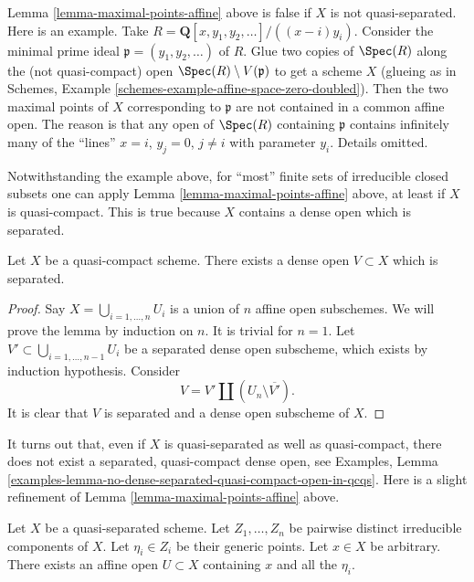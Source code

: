 \begin{remark}
\label{remark-maximal-points-affine}
Lemma \ref{lemma-maximal-points-affine} above is false if $X$
is not quasi-separated. Here is an example. Take
$R = \mathbf{Q}[x, y_1, y_2, \ldots]/((x-i)y_i)$.
Consider the minimal prime ideal $\mathfrak p = (y_1, y_2, \ldots)$
of $R$. Glue two copies of $\Spec(R)$ along the
(not quasi-compact) open $\Spec(R) \setminus V(\mathfrak p)$
to get a scheme $X$ (glueing as in
Schemes, Example \ref{schemes-example-affine-space-zero-doubled}).
Then the two maximal points of $X$ corresponding to $\mathfrak p$
are not contained in a common affine open. The reason is
that any open of $\Spec(R)$ containing $\mathfrak p$
contains infinitely many of the ``lines'' $x = i$, $y_j = 0$,
$j \not = i$ with parameter $y_i$. Details omitted.
\end{remark}

\noindent
Notwithstanding the example above, for ``most'' finite sets of irreducible
closed subsets one can apply Lemma \ref{lemma-maximal-points-affine} above,
at least if $X$ is quasi-compact. This is true because $X$ contains a dense
open which is separated.

\begin{lemma}
\label{lemma-quasi-compact-dense-open-separated}
Let $X$ be a quasi-compact scheme.
There exists a dense open $V \subset X$ which is separated.
\end{lemma}

\begin{proof}
Say $X = \bigcup_{i = 1, \ldots, n} U_i$ is a union of $n$ affine open
subschemes. We will prove the lemma by induction on $n$. It is trivial for
$n = 1$. Let $V' \subset \bigcup_{i = 1, \ldots, n - 1} U_i$ be a separated
dense open subscheme, which exists by induction hypothesis. Consider
$$
V = V' \coprod (U_n \setminus \overline{V'}).
$$
It is clear that $V$ is separated and a dense open subscheme of $X$.
\end{proof}

\noindent
It turns out that, even if $X$ is quasi-separated as well as quasi-compact,
there does not exist a separated, quasi-compact dense open, see
Examples, Lemma
\ref{examples-lemma-no-dense-separated-quasi-compact-open-in-qcqs}.
Here is a slight refinement of Lemma \ref{lemma-maximal-points-affine} above.

\begin{lemma}
\label{lemma-point-and-maximal-points-affine}
Let $X$ be a quasi-separated scheme. Let $Z_1, \ldots, Z_n$ be pairwise
distinct irreducible components of $X$. Let $\eta_i \in Z_i$ be their
generic points. Let $x \in X$ be arbitrary.
There exists an affine open $U \subset X$ containing
$x$ and all the $\eta_i$.
\end{lemma}

